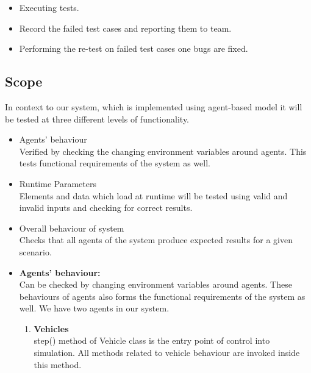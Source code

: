 \documentclass[11pt]{article}
\begin{document}
\begin{enumerate}
\begin{itemize}
\item Executing tests.

\item Record the failed test cases and reporting them to team.

\item Performing the re-test on failed test cases one bugs are fixed.
\end{itemize}

\subsection{Scope}
In context to our system, which is implemented using agent-based model it will be tested at three different levels of functionality.
\begin{itemize}
\item Agents' behaviour\hfill \\
Verified by checking the changing environment variables around agents. This tests functional requirements of the system as well.\hfill \\

\item Runtime Parameters\hfill \\
Elements and data which load at runtime will be tested using valid and invalid inputs and checking for correct results. \hfill \\

\item Overall behaviour of system\hfill \\
Checks that all agents of the system produce expected results for a given scenario.\hfill \\

\end{itemize} 

\begin{itemize}
\subsubsection{Levels of Functionalities}
\item \textbf{Agents' behaviour: }\hfill \\
Can be checked by changing environment variables around agents. These behaviours of agents also forms the functional requirements of the system as well. We have two agents in our system. \begin{enumerate}

\item \textbf{Vehicles}\hfill \\
step() method of Vehicle class is the entry point of control into simulation. All methods related to vehicle behaviour are invoked inside this method.\hfill \\


\end{enumerate}
\end{itemize}
\end{enumerate}
\end{document}
